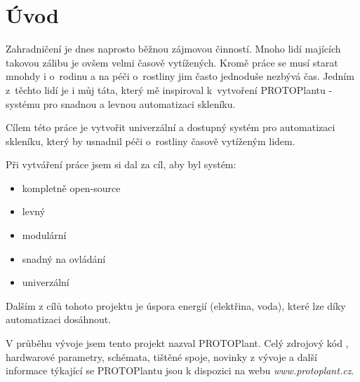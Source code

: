 \chapter*{Úvod}

Zahradničení je dnes naprosto běžnou zájmovou činností. Mnoho lidí majících takovou zálibu je ovšem velmi časově vytížených. Kromě práce se musí starat mnohdy i o~rodinu a na péči o~rostliny jim často jednoduše nezbývá čas. Jedním z~těchto lidí je i můj táta, který mě inspiroval k~vytvoření PROTOPlantu - systému pro snadnou a levnou automatizaci skleníku.

Cílem této práce je vytvořit univerzální a dostupný systém pro automatizaci skleníku, který by usnadnil péči o~rostliny časově vytíženým lidem. 

Při vytváření práce jsem si dal za cíl, aby byl systém:
\begin{itemize}
    \item kompletně open-source
    \item levný
    \item modulární
    \item snadný na ovládání
    \item univerzální
\end{itemize}

Dalším z cílů tohoto projektu je úspora energií (elektřina, voda), které lze díky automatizaci dosáhnout.

V průběhu vývoje jsem tento projekt nazval PROTOPlant.
Celý zdrojový kód , hardwarové parametry, schémata, tištěné spoje, novinky z vývoje a další informace týkající se PROTOPlantu jsou k dispozici na webu \textit{www.protoplant.cz}.
\newpage
